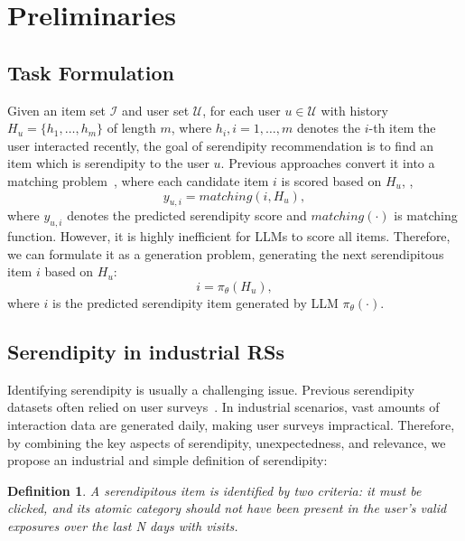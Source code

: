 \section{Preliminaries}\label{sect:network_structure}
\subsection{Task Formulation}
Given an item set $\mathcal{I}$ and user set $\mathcal{U}$, for each user $u\in\mathcal{U}$ with history $H_u=\{h_1,\ldots,h_m\}$ of length $m$, where $h_i, i=1,\ldots,m$ denotes the $i$-th item the user interacted recently, the goal of serendipity recommendation is to find an item which is serendipity to the user $u$. Previous approaches convert it into a matching problem~\cite{fu2023wisdom,fu2024art}, where each candidate item $i$ is scored based on $H_u$, \ie,
\begin{equation}
    y_{u,i} = matching(i, H_u),
\end{equation}
where $y_{u,i}$ denotes the predicted serendipity score and $matching(\cdot)$ is matching function.
However, it is highly inefficient for LLMs to score all items. Therefore, we can formulate it as a generation problem, generating the next serendipitous item $i$ based on $H_u$:
\begin{equation}
    i = \pi_{\theta}(H_u),
\end{equation}
where $i$ is the predicted serendipity item generated by LLM $\pi_{\theta}(\cdot)$.

\subsection{Serendipity in industrial RSs}
Identifying serendipity is usually a challenging issue. Previous serendipity datasets often relied on user surveys~\cite{kotkov2018investigating,chen2019serendipity}. In industrial scenarios, vast amounts of interaction data are generated daily, making user surveys impractical. Therefore, by combining the key aspects of serendipity, unexpectedness, and relevance, we propose an industrial and simple definition of serendipity: 
\newtheorem{defi}{Definition}
\begin{defi}
A serendipitous item is identified by two criteria: it must be clicked, and its atomic category should not have been present in the user's valid exposures over the last N days with visits.
\label{def:serend} 
\end{defi}

